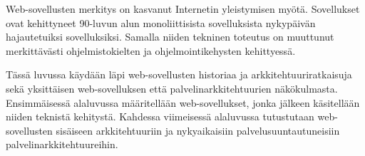 Web-sovellusten merkitys on kasvanut Internetin yleistymisen myötä. Sovellukset ovat kehittyneet 90-luvun alun monoliittisista sovelluksista nykypäivän hajautetuiksi sovelluksiksi. Samalla niiden tekninen toteutus on muuttunut merkittävästi ohjelmistokielten ja ohjelmointikehysten kehittyessä.

Tässä luvussa käydään läpi web-sovellusten historiaa ja arkkitehtuuriratkaisuja sekä yksittäisen web-sovelluksen että palvelinarkkitehtuurien näkökulmasta. Ensimmäisessä alaluvussa määritellään web-sovellukset, jonka jälkeen käsitellään niiden teknistä kehitystä. Kahdessa viimeisessä alaluvussa tutustutaan web-sovellusten si\-säi\-seen arkkitehtuuriin ja nykyaikaisiin palvelusuuntautuneisiin palvelinarkkitehtuureihin.